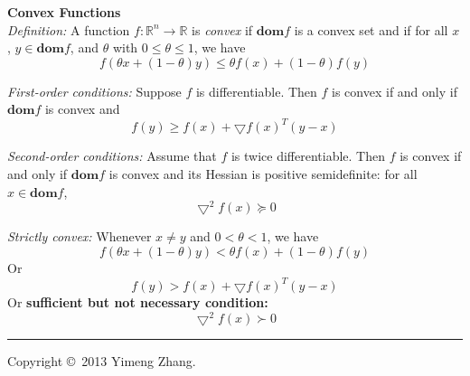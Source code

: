 \documentclass[10pt,landscape]{article}
\begin{document}
\begin{multicols}{3}
\textbf{Convex Functions} \\
\emph{Definition:} A function $f: \mathbb{R}^n \to \mathbb{R}$ is \emph{convex} if $\mathbf{dom} f$ is a convex set and if for all $x$, $y \in \mathbf{dom} f$, and $\theta$ with $0 \leq \theta \leq 1$, we have \\
$$ f(\theta x + (1 - \theta) y) \leq \theta f(x) + (1 - \theta) f(y) $$

\emph{First-order conditions:} Suppose $f$ is differentiable. Then $f$ is convex if and only if $\mathbf{dom} f$ is convex and
$$ f(y) \geq f(x) + \bigtriangledown f(x)^T (y-x) $$

\emph{Second-order conditions:} Assume that $f$ is twice differentiable. Then $f$ is convex if and only if $\mathbf{dom} f$ is convex and its Hessian is positive semidefinite: for all $x \in \mathbf{dom} f$,
$$ {\bigtriangledown}^2 f(x) \succeq 0 $$

\emph{Strictly convex:} Whenever $x \neq y$ and $0 < \theta < 1$, we have
$$ f(\theta x + (1 - \theta) y) < \theta f(x) + (1 - \theta) f(y) $$
Or
$$ f(y) > f(x) + \bigtriangledown f(x)^T (y-x) $$
Or \textbf{sufficient but not necessary condition:}
$$ {\bigtriangledown}^2 f(x) \succ 0 $$


\rule{0.3\linewidth}{0.25pt}
\scriptsize

Copyright \copyright\ 2013 Yimeng Zhang.

\end{multicols}
\end{document}

